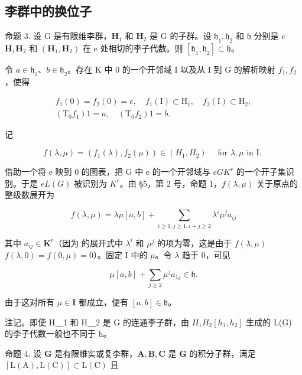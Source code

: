 \subsection{李群中的换位子}

命题 3. 设 G 是有限维李群，\(\mathbf{H}_1\) 和 \(\mathbf{H}_2\) 是 G 的子群。设 \(\mathfrak{h}_1, \mathfrak{h}_2\) 和 \(\mathfrak{h}\) 分别是 \(e\)\(\mathbf{H}_1\mathbf{H}_2\) 和 \((\mathbf{H}_1,\mathbf{H}_2)\) 在 e 处相切的李子代数。则 \([\mathfrak{h}_1,\mathfrak{h}_2] \subset \mathfrak{h}\)。

令 \(a \in \mathfrak{h}_1\)、\(b \in \mathfrak{h}_2\)。存在 K 中 0 的一个开邻域 I 以及从 I 到 G 的解析映射 \(f_1, f_2\)，使得

\[
\begin{array}{c} f _ {1} (0) = f _ {2} (0) = e, \quad f _ {1} (\mathrm{I}) \subset \mathrm{H} _ {1}, \quad f _ {2} (\mathrm{I}) \subset \mathrm{H} _ {2}, \\ (\mathrm{T} _ {0} f _ {1}) 1 = a, \quad (\mathrm{T} _ {0} f _ {2}) 1 = b. \end{array}
\]

记

\[
f (\lambda , \mu) = (f _ {1} (\lambda), f _ {2} (\mu)) \in (H _ {1}, H _ {2}) \quad \text { for   } \lambda , \mu \text {   in   I. }
\]

借助一个将 e 映到 0 的图表，把 G 中 e 的一个开邻域与 \(e\)\(G\)\(K^r\) 的一个开子集识别。于是 \(e\)\(L(G)\) 被识别为 \(K^r\)。由 §5，第 2 号，命题 1，\(f(\lambda, \mu)\) 关于原点的整级数展开为

\[
f (\lambda , \mu) = \lambda \mu [ a, b ] + \sum_ {i \geqslant 1, j \geqslant 1, i + j \geqslant 2} \lambda^ {i} \mu^ {j} a _ {i j}
\]

其中 \(a_{ij} \in \mathbf{K}^r\)（因为  的展开式中 \(\lambda^i\) 和 \(\mu^j\) 的项为零，这是由于 \(f(\lambda, \mu)\)\(f(\lambda, 0) = f(0, \mu) = 0\)）。固定 I 中的 \(\mu\)。令 \(\lambda\) 趋于 0，可见

\[
\mu [ a, b ] + \sum_ {j \geqslant 2} \mu^ {j} a _ {1 j} \in \mathfrak {h}.
\]

由于这对所有 \(\mu\in\mathbf{I}\) 都成立，便有 \([a,b]\in\mathfrak{h}\)。

注记。即使 H＿1 和 H＿2 是 G 的连通李子群，由 \(H_{1}\)\(H_{2}\)\([h_{1}, h_{2}]\) 生成的 L(G) 的李子代数一般也不同于 h。

命题 4. 设 \(\mathbf{G}\) 是有限维实或复李群，\(\mathbf{A}, \mathbf{B}, \mathbf{C}\) 是 \(\mathbf{G}\) 的积分子群，满足 \([\mathrm{L}(\mathrm{A}), \mathrm{L}(\mathrm{C})] \subset \mathrm{L}(\mathrm{C})\) 且

